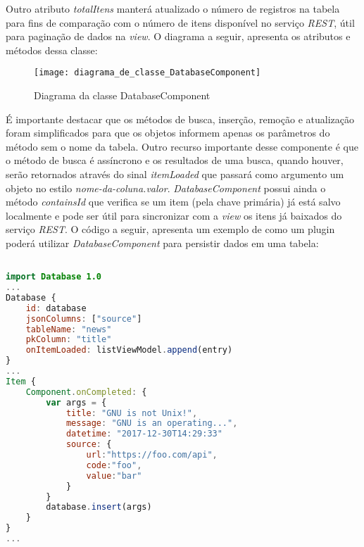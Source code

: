 Outro atributo \textit{totalItens} manterá atualizado o número de registros na tabela para fins de comparação com o número de itens disponível no serviço \textit{REST}, útil para paginação de dados na \textit{view}. O diagrama a seguir, apresenta os atributos e métodos dessa classe:

\begin{figure}[H]
	\texttt{[image: diagrama\_de\_classe\_DatabaseComponent]}
	\centering
	\caption{Diagrama da classe DatabaseComponent}
\end{figure}

É importante destacar que os métodos de busca, inserção, remoção e atualização foram simplificados para que os objetos informem apenas os parâmetros do método sem o nome da tabela. Outro recurso importante desse componente é que o método de busca é assíncrono e os resultados de uma busca, quando houver, serão retornados através do sinal \textit{itemLoaded} que passará como argumento um objeto no estilo \textit{nome-da-coluna.valor}. \textit{DatabaseComponent} possui ainda o método \textit{containsId} que verifica se um item (pela chave primária) já está salvo localmente e pode ser útil para sincronizar com a \textit{view} os itens já baixados do serviço \textit{REST}. O código a seguir, apresenta um exemplo de como um plugin poderá utilizar \textit{DatabaseComponent} para persistir dados em uma tabela:

\begin{center}
\begin{lstlisting}[language=qml]

import Database 1.0
...
Database {
	id: database
	jsonColumns: ["source"]
	tableName: "news"
	pkColumn: "title"
	onItemLoaded: listViewModel.append(entry)
}
...
Item {
	Component.onCompleted: {
		var args = {
			title: "GNU is not Unix!",
			message: "GNU is an operating...",
			datetime: "2017-12-30T14:29:33"
			source: {
				url:"https://foo.com/api",
				code:"foo",
				value:"bar"
			}
		}
		database.insert(args)
	}
}
...
\end{lstlisting}
\end{center}


